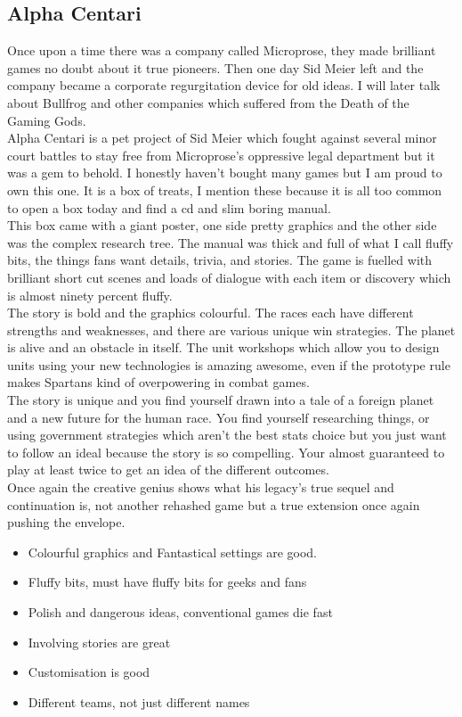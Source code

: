 \documentclass[a4paper]{article}
\begin{document}
\subsection{Alpha Centari}
Once upon a time there was a company called Microprose, they made brilliant games no doubt about it true pioneers. Then one day Sid Meier left and the company became a corporate regurgitation device for old ideas. I will later talk about Bullfrog and other companies which suffered from the Death of the Gaming Gods.\\
Alpha Centari is a pet project of Sid Meier which fought against several minor court battles to stay free from Microprose's oppressive legal department but it was a gem to behold. I honestly haven't bought many games but I am proud to own this one. It is a box of treats, I mention these because it is all too common to open a box today and find a cd and slim boring manual.\\
This box came with a giant poster, one side pretty graphics and the other side was the complex research tree. The manual was thick and full of what I call fluffy bits, the things fans want details, trivia, and stories. The game is fuelled with brilliant short cut scenes and loads of dialogue with each item or discovery which is almost ninety percent fluffy.\\
The story is bold and the graphics colourful. The races each have different strengths and weaknesses, and there are various unique win strategies. The planet is alive and an obstacle in itself. The unit workshops which allow you to design units using your new technologies is amazing awesome, even if the prototype rule makes Spartans kind of overpowering in combat games.\\
The story is unique and you find yourself drawn into a tale of a foreign planet and a new future for the human race. You find yourself researching things, or using government strategies which aren't the best stats choice but you just want to follow an ideal because the story is so compelling. Your almost guaranteed to play at least twice to get an idea of the different outcomes.\\
Once again the creative genius shows what his legacy's true sequel and continuation is, not another rehashed game but a true extension once again pushing the envelope.

\begin{itemize}
\item Colourful graphics and Fantastical settings are good.
\item Fluffy bits, must have fluffy bits for geeks and fans
\item Polish and dangerous ideas, conventional games die fast
\item Involving stories are great
\item Customisation is good
\item Different teams, not just different names
\end{itemize}
\end{document}
